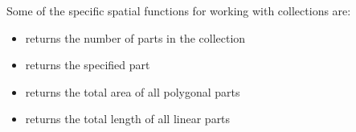\documentclass[a4paper,11pt,english]{sphinxmanual}
\begin{document}

Some of the specific spatial functions for working with collections are:
\begin{itemize}
\item {} 
 returns the number of parts in the collection

\item {} 
 returns the specified part

\item {} 
 returns the total area of all polygonal parts

\item {} 
 returns the total length of all linear parts

\end{itemize}
\end{document}
